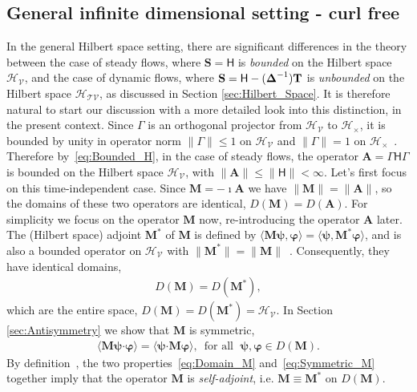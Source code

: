 \documentclass[leqno,onefignum,onetabnum]{siamltex1213}
\newcommand{\Mb}{\mathbf{M}}
\newcommand{\Tb}{\mathbf{T}}
\newcommand{\Sb}{\mathbf{S}}
\newcommand{\Ab}{\mathbf{A}}
\newcommand{\Tc}{\mathcal{T}}
\newcommand{\Vc}{\mathcal{V}}
\newcommand{\Hc}{\mathcal{H}}
\newcommand{\Hm}{\mathsf{H}}
\newcommand\bDelta{\mbox{\boldmath${\Delta}$}}
\providecommand\bcdot{\boldsymbol{\cdot}}
\newcommand{\vecpsi}{\boldsymbol{\psi}}
\newcommand{\vecvarphi}{\boldsymbol{\varphi}}
\begin{document}
\subsection{General infinite dimensional setting - curl free}
\label{sec:Integral_Rep_General_curl_free}
%
In the general Hilbert space setting, there are significant
differences in the theory between the case of steady flows, where
$\Sb=\Hm$ is \emph{bounded} on the Hilbert space $\Hc_{\Vc}$, and
the case of dynamic flows, where $\Sb=\Hm-(\bDelta^{-1})\Tb$ is
\emph{unbounded} on the Hilbert space $\Hc_{\Tc\Vc}$, as discussed in
Section \ref{sec:Hilbert_Space}. It is therefore natural to start our
discussion with a more detailed look into this distinction, in the
present context. Since $\Gamma$ is an orthogonal projector from
$\Hc_{\Vc}$ to $\Hc_\times$, it is bounded by unity in operator norm
$\|\Gamma\|\leq1$ on $\Hc_{\Vc}$ and $\|\Gamma\|=1$ on
$\Hc_\times$~\cite{Reed-1980,Stone:64}. Therefore by~\eqref{eq:Bounded_H},
in the 
case of  steady flows, the operator $\Ab=\Gamma\Hm\Gamma$ is bounded
on the Hilbert space $\Hc_{\Vc}$, with $\|\Ab\|\leq\|\Hm\|<\infty$. Let's first
focus on this time-independent case. Since $\Mb=-\imath\Ab$ we have 
$\|\Mb\|=\|\Ab\|$, so the domains of these two operators are identical,
$D(\Mb)=D(\Ab)$. For simplicity we focus on the operator $\Mb$ now,
re-introducing the operator $\Ab$ later. The (Hilbert space)
adjoint $\Mb^*$ of $\Mb$ is defined by
$\langle\Mb\vecpsi,\vecvarphi\rangle=\langle\vecpsi,\Mb^*\vecvarphi\rangle$, and is also a
bounded operator on $\Hc_{\Vc}$ with
$\|\Mb^*\|=\|\Mb\|$~\cite{Reed-1980}. Consequently, they have identical
domains,        
%
\begin{align}%
  D(\Mb)=D(\Mb^*),
\end{align}
%
which are the entire space, $D(\Mb)=D(\Mb^*)=\Hc_{\Vc}$. In
Section \ref{sec:Antisymmetry} we show that $\Mb$ is symmetric,
%
\begin{align}%
  \langle\Mb\vecpsi\bcdot\vecvarphi\rangle=\langle\vecpsi\bcdot\Mb\vecvarphi\rangle,
  \, \text{ for all } \; \vecpsi,\vecvarphi\in D(\Mb).
\end{align}
%
By definition~\cite{Reed-1980,Stone:64}, the two
properties~\eqref{eq:Domain_M} and~\eqref{eq:Symmetric_M} together
imply that the operator $\Mb$ is \emph{self-adjoint}, i.e. $\Mb\equiv\Mb^*$
on $D(\Mb)$. 
\end{document}
